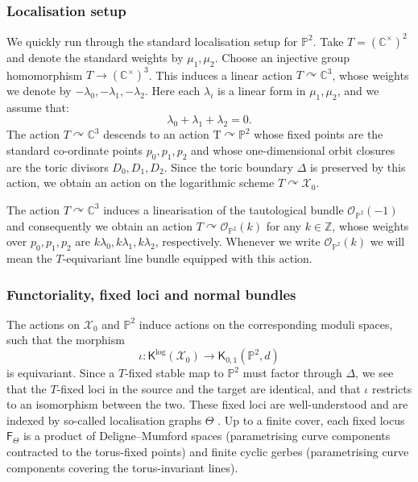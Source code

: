 \documentclass[11pt]{amsart}
\theoremstyle{definition}
\theoremstyle{definition}
\newcommand{\C}{\mathbb{C}}
\newcommand{\T}{\mathrm{T}}
\newcommand{\PP}{\mathbb{P}}
\newcommand{\OO}{\mathcal{O}}
\newcommand{\Z}{\mathbb{Z}}
\newcommand{\Xcal}{\mathcal{X}}
\newcommand{\Kup}{\mathsf{K}}
\newcommand{\Fup}{\mathsf{F}}
\newcommand{\Cstar}{\C^\times}
\newcommand{\acts}{\curvearrowright}
\begin{document}
\subsubsection{Localisation setup}\label{subsection localisation setup} We quickly run through the standard localisation setup for $\PP^2$. Take $T=(\Cstar)^2$ and denote the standard weights by $\mu_1,\mu_2$. Choose an injective group homomorphism $T \to (\Cstar)^3$. This induces a linear action $T \acts \C^3$, whose weights we denote by $-\lambda_0,-\lambda_1,-\lambda_2$. Here each $\lambda_i$ is a linear form in $\mu_1,\mu_2$, and we assume that:
\begin{equation}\label{eqn: condition on weights} \lambda_0+\lambda_1+\lambda_2=0.\end{equation}
The action $T \acts \C^3$ descends to an action $\T \acts \PP^2$ whose fixed points are the standard co-ordinate points $p_0,p_1,p_2$ and whose one-dimensional orbit closures are the toric divisors $D_0,D_1,D_2$. Since the toric boundary $\Delta$ is preserved by this action, we obtain an action on the logarithmic scheme $T \acts \Xcal_0$.

The action $T \acts \C^3$ induces a linearisation of the tautological bundle $\OO_{\PP^2}(-1)$ and consequently we obtain an action $T \acts \OO_{\PP^2}(k)$ for any $k \in \Z$, whose weights over $p_0,p_1,p_2$ are $k\lambda_0,k\lambda_1,k\lambda_2$, respectively. Whenever we write $\OO_{\PP^2}(k)$ we will mean the $T$-equivariant line bundle equipped with this action.


\subsubsection{Functoriality, fixed loci and normal bundles}\label{subsection fixed loci}
The actions on $\Xcal_0$ and $\PP^2$ induce actions on the corresponding moduli spaces, such that the morphism
\begin{equation*} \iota \colon \Kup^{\log}(\Xcal_0) \to \Kup_{0,1}(\PP^2,d) \end{equation*}
is equivariant. Since a $T$-fixed stable map to $\PP^2$ must factor through $\Delta$, we see that the $T$-fixed loci in the source and the target are identical, and that $\iota$ restricts to an isomorphism between the two. These fixed loci are well-understood and are indexed by so-called localisation graphs $\Theta$ \cite{KontsevichEnumeration, GraberPandharipande}. Up to a finite cover, each fixed locus $\Fup_\Theta$ is a product of Deligne--Mumford spaces (parametrising curve components contracted to the torus-fixed points) and finite cyclic gerbes (parametrising curve components covering the torus-invariant lines).
\end{document}
